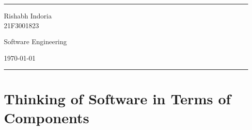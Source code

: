 \documentclass[a4paper]{article}
\begin{document}
\fancyhead[c]{}
\hrule \medskip
\begin{minipage}{0.295\textwidth}
\raggedright
Rishabh Indoria\\
21F3001823
\end{minipage}
\begin{minipage}{0.4\textwidth}
\centering
\LARGE
Software Engineering
\end{minipage}
\begin{minipage}{0.295\textwidth}
\raggedleft
\today \hfill \\
\end{minipage}
\medskip \hrule
\bigskip

\section{Thinking of Software in Terms of Components}
\end{document}
